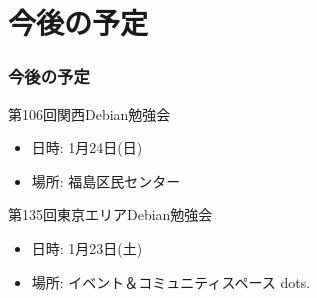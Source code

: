 \documentclass[cjk,dvipdfmx,10pt,compress,%
hyperref={bookmarks=true,bookmarksnumbered=true,bookmarksopen=false,%
colorlinks=false,%
pdftitle={第 105 回 関西 Debian 勉強会},%
pdfauthor={倉敷・のがた・佐々木・かわだ},%
pdfsubject={資料},%
}]{beamer}
\begin{document}
\section{今後の予定}
\begin{frame}[fragile]
\frametitle{今後の予定}

\begin{block}{第106回関西Debian勉強会}
  \begin{itemize}
  \item 日時: 1月24日(日)
  \item 場所: 福島区民センター
  \end{itemize}
\end{block}

\begin{block}{第135回東京エリアDebian勉強会}
  \begin{itemize}
  \item 日時: 1月23日(土)
  \item 場所: イベント＆コミュニティスペース dots.
  \end{itemize}
\end{block}

\end{frame}

\takahashi[50]{  }
\end{document}
